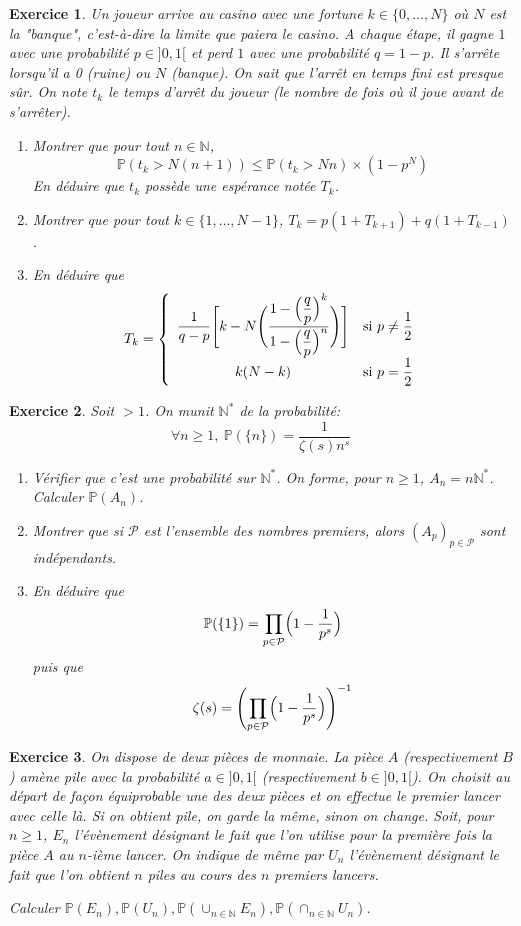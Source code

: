 \documentclass[12pt]{article}
\newtheorem{exercise}{Exercice}[section]
\theoremstyle{remark}
\theoremstyle{remark}
\newcommand{\N}{\mathbb{N}}
\renewcommand{\P}{\mathbb{P}}
\begin{document}
\begin{exercise}
	Un joueur arrive au casino avec une fortune $k\in\{0,\dots,N\}$ où $N$ est
	la "banque", c'est-à-dire la limite que paiera le casino. A chaque étape, il
	gagne $1$ avec une probabilité $p\in]0,1[$ et perd $1$ avec une probabilité
	$q=1-p$. Il s'arrête lorsqu'il a 0 (ruine) ou $N$ (banque). On sait que
	l'arrêt en temps fini est presque sûr. On note $t_{k}$ le temps d'arrêt du
	joueur (le nombre de fois où il joue avant de s'arrêter).
	\begin{enumerate}
		\item Montrer que pour tout $n\in\N$,
		$$\P(t_{k}>N(n+1))\leqslant\P(t_{k}>Nn)\times(1-p^{N})$$
		En déduire que $t_{k}$ possède une espérance notée $T_{k}$.
		\item Montrer que pour tout $k\in\{1,\dots,N-1\}$, $T_{k}=p(1+T_{k+1})+q(1+T_{k-1})$.
		\item En déduire que 
		$$T_{k}=
		\left\{
			\begin{array}[]{cc}
				\dfrac{1}{q-p}\Biggl[k-N\Biggl(\dfrac{1-\Bigl(\dfrac{q}{p}\Bigr)^{k}}{1-\Bigl(\dfrac{q}{p}\Bigr)^{n}}\Biggr)\Biggr]
& \text{si }p\neq\dfrac{1}{2}\\
				k(N-k) & \text{si }p=\dfrac{1}{2}
			\end{array}
		\right.$$
	\end{enumerate}
\end{exercise}

\begin{exercise}
	Soit $>1$. On munit $\N^{*}$ de la probabilité:
	$$\forall n\geqslant1,~\P(\{n\})=\frac{1}{\zeta(s)n^{s}}$$
	\begin{enumerate}
		\item Vérifier que c'est une probabilité sur $\N^{*}$. On forme, pour
		$n\geqslant 1$, $A_{n}=n\N^{*}$. Calculer $\P(A_{n})$.
		\item Montrer que si $\mathcal{P}$ est l'ensemble des nombres premiers,
		alors $(A_{p})_{p\in\mathcal{P}}$ sont indépendants.
		\item En déduire que 
		$$\P(\{1\})=\prod_{p\in\mathcal{P}}\Bigl(1-\frac{1}{p^{s}}\Bigr)$$
		puis que 
		$$\zeta(s)=\Biggl(\prod_{p\in\mathcal{P}}\Bigl(1-\frac{1}{p^{s}}\Bigr)\Biggr)^{-1}$$
	\end{enumerate}
\end{exercise}

\begin{exercise}
	On dispose de deux pièces de monnaie. La pièce $A$ (respectivement $B$) amène pile avec la
	probabilité $a\in]0,1[$ (respectivement $b\in]0,1[$). On choisit au départ
	de façon équiprobable une des deux pièces et on effectue le premier lancer
	avec celle là. Si on obtient pile, on garde la même, sinon on change. Soit,
	pour $n\geqslant1$, $E_{n}$ l'évènement désignant le fait que l'on utilise
	pour la première fois la pièce $A$ au $n$-ième lancer. On indique de même
	par $U_{n}$ l'évènement désignant le fait que l'on obtient $n$ piles au
	cours des $n$ premiers lancers.

	Calculer $\P(E_{n}),\P(U_{n}),\P(\cup_{n\in\N}E_{n}),\P(\cap_{n\in\N}U_{n})$.
\end{exercise}
\end{document}
